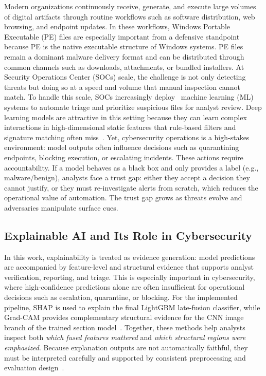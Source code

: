 \documentclass[conference]{IEEEtran}
\begin{document}
Modern organizations continuously receive, generate, and execute large volumes of digital artifacts through routine workflows such as software distribution, web browsing, and endpoint updates.
In these workflows, Windows Portable Executable (PE) files are especially important from a defensive standpoint because PE is the native executable structure of Windows systems.
PE files remain a dominant malware delivery format and can be distributed through common channels such as downloads, attachments, or bundled installers.
At Security Operations Center (SOCs) scale, the challenge is not only detecting threats but doing so at a speed and volume that manual inspection cannot match.
To handle this scale, SOCs increasingly deploy~\cite{SDRS2025} machine learning (ML) systems to automate triage and prioritize suspicious files for analyst review.
Deep learning models are attractive in this setting because they can learn complex interactions in high-dimensional static features that rule-based filters and signature matching often miss~\cite{DSR2025ai}.
Yet, cybersecurity operations is a high-stakes environment: model outputs often influence decisions such as quarantining endpoints, blocking execution, or escalating incidents.
These actions require accountability.
If a model behaves as a black box and only provides a label (e.g., malware/benign), analysts face a trust gap: either they accept a decision they cannot justify, or they must re-investigate alerts from scratch, which reduces the operational value of automation.
The trust gap grows as threats evolve and adversaries manipulate surface cues.

\subsection{Explainable AI and Its Role in Cybersecurity}

In this work, explainability is treated as evidence generation: model predictions are accompanied by feature-level and structural evidence that supports analyst verification, reporting, and triage.
This is especially important in cybersecurity, where high-confidence predictions alone are often insufficient for operational decisions such as escalation, quarantine, or blocking.
For the implemented pipeline, SHAP is used to explain the final LightGBM late-fusion classifier, while Grad-CAM provides complementary structural evidence for the CNN image branch of the trained section model~\cite{LL2017,SCDVPB2017}.
Together, these methods help analysts inspect both \emph{which fused features mattered} and \emph{which structural regions were emphasized}.
Because explanation outputs are not automatically faithful, they must be interpreted carefully and supported by consistent preprocessing and evaluation design~\cite{JW2019}.
\end{document}
